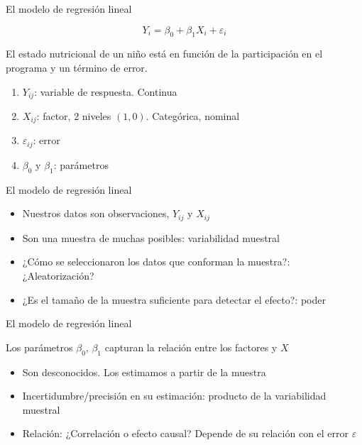 \documentclass{beamer}
\begin{document}
\begin{frame}{El modelo de regresión lineal}

\begin{equation*}
    Y_{i}=\beta_0+\beta_1X_i+\varepsilon_i
\end{equation*}

El estado nutricional de un niño está en función de la participación en el programa y un término de error. 

\begin{enumerate}
    \item $Y_{ij}$: variable de respuesta. Continua
    \item $X_{ij}$: factor, 2 niveles $(1,0)$. Categórica, nominal
    \item $\varepsilon_{ij}$: error
    \item $\beta_0$ y $\beta_1$: parámetros
\end{enumerate}
    
\end{frame}

\begin{frame}{El modelo de regresión lineal}

\begin{itemize}
    \item Nuestros datos son observaciones, $Y_{ij}$ y $X_{ij}$
    \item Son una muestra de muchas posibles: variabilidad muestral
    \item ¿Cómo se seleccionaron los datos que conforman la muestra?: ¿Aleatorización?
    \item ¿Es el tamaño de la muestra suficiente para detectar el efecto?: poder
\end{itemize}
    
\end{frame}

\begin{frame}{El modelo de regresión lineal}

Los parámetros $\beta_0$, $\beta_1$ capturan la relación entre los factores y $X$

\begin{itemize}
    \item Son desconocidos. Los estimamos a partir de la muestra
    \item Incertidumbre/precisión en su estimación: producto de la variabilidad muestral
    \item Relación: ¿Correlación o efecto causal? Depende de su relación con el error $\varepsilon$
\end{itemize}
    
\end{frame}
\end{document}
